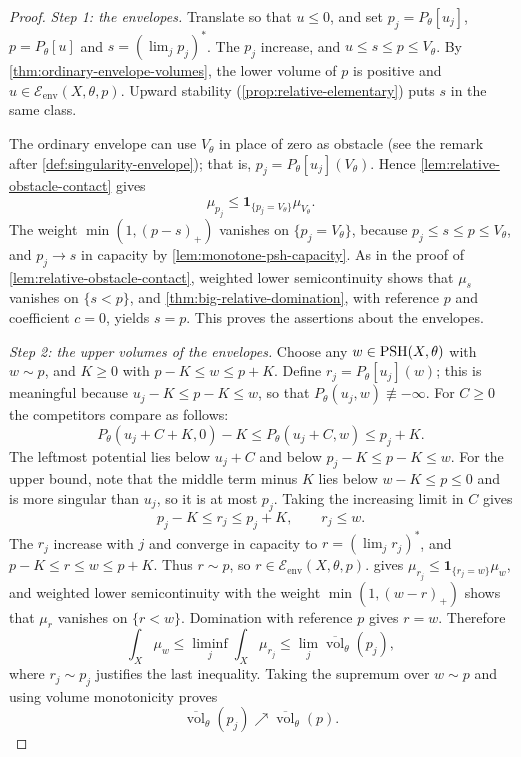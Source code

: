 \begin{proof}
\emph{Step 1: the envelopes.} Translate so that $u\leq0$, and set $p_j=P_\theta[u_j]$, $p=P_\theta[u]$ and $s=(\lim_jp_j)^*$. The $p_j$ increase, and $u\leq s\leq p\leq V_\theta$. By \cref{thm:ordinary-envelope-volumes}, the lower volume of $p$ is positive and $u\in\mathcal E_{\mathrm{env}}(X,\theta,p)$. Upward stability (\cref{prop:relative-elementary}) puts $s$ in the same class.

The ordinary envelope can use $V_\theta$ in place of zero as obstacle (see the remark after \cref{def:singularity-envelope}); that is, $p_j=P_\theta[u_j](V_\theta)$. Hence \cref{lem:relative-obstacle-contact} gives
\[
 \mu_{p_j}\leq\mathbf1_{\{p_j=V_\theta\}}\mu_{V_\theta}.
\]
The weight $\min(1,(p-s)_+)$ vanishes on $\{p_j=V_\theta\}$, because $p_j\leq s\leq p\leq V_\theta$, and $p_j\to s$ in capacity by \cref{lem:monotone-psh-capacity}. As in the proof of \cref{lem:relative-obstacle-contact}, weighted lower semicontinuity shows that $\mu_s$ vanishes on $\{s<p\}$, and \cref{thm:big-relative-domination}, with reference $p$ and coefficient $c=0$, yields $s=p$. This proves the assertions about the envelopes.

\emph{Step 2: the upper volumes of the envelopes.} Choose any $w\in\mathrm{PSH}(X,\theta)$ with $w\sim p$, and $K\geq0$ with $p-K\leq w\leq p+K$. Define $r_j=P_\theta[u_j](w)$; this is meaningful because $u_j-K\leq p-K\leq w$, so that $P_\theta(u_j,w)\not\equiv-\infty$. For $C\geq0$ the competitors compare as follows:
\[
 P_\theta(u_j+C+K,0)-K
       \leq P_\theta(u_j+C,w)\leq p_j+K.
\]
The leftmost potential lies below $u_j+C$ and below $p_j-K\leq p-K\leq w$. For the upper bound, note that the middle term minus $K$ lies below $w-K\leq p\leq0$ and is more singular than $u_j$, so it is at most $p_j$. Taking the increasing limit in $C$ gives
\[
 p_j-K\leq r_j\leq p_j+K,\qquad r_j\leq w.
\]
The $r_j$ increase with $j$ and converge in capacity to $r=(\lim_jr_j)^*$, and $p-K\leq r\leq w\leq p+K$. Thus $r\sim p$, so $r\in\mathcal E_{\mathrm{env}}(X,\theta,p)$.  gives $\mu_{r_j}\leq\mathbf1_{\{r_j=w\}}\mu_w$, and weighted lower semicontinuity with the weight $\min(1,(w-r)_+)$ shows that $\mu_r$ vanishes on $\{r<w\}$. Domination with reference $p$ gives $r=w$. Therefore
\[
 \int_X\mu_w\leq\liminf_j\int_X\mu_{r_j}
       \leq\lim_j\overline{\operatorname{vol}}_\theta(p_j),
\]
where $r_j\sim p_j$ justifies the last inequality. Taking the supremum over $w\sim p$ and using volume monotonicity proves
\[
 \overline{\operatorname{vol}}_\theta(p_j)\nearrow
       \overline{\operatorname{vol}}_\theta(p).
\]


\end{proof}
